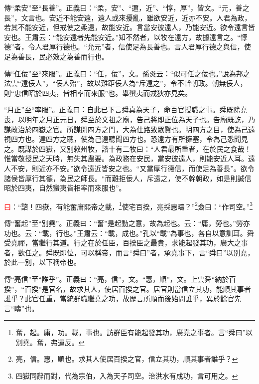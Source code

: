 {\noindent\zhuan{}\fzbyks 傳“柔安”至“長善”。正義曰：“柔，安”、“邇，近”、“惇，厚”，皆文。“元，善之長”，文言也。安近不能安遠，遠人或來擾亂，雖欲安近，近亦不安。人君為政，若其不能安近，但戒使之柔遠，故能安近。言當安彼遠人，乃能安近。欲令遠言皆安也。王肅云：“能安遠者先能安近。”知不然者，以牧在遠方，故據遠言之。“惇德”者，令人君厚行德也。“允元”者，信使足為長善也。言人君厚行德之與信，使足為善長，民必效之為善而行也。 \par}

{\noindent\zhuan{}\fzbyks 傳“任佞”至“來服”。正義曰：“任，佞”，文。孫炎云：“似可任之佞也。”說為邦之法雲“遠佞人”，“佞人殆”，故以難距佞人為“斥遠之”，令不幹朝政。朝無佞人，則“忠信昭於四夷，皆相率而來服”也。舉蠻夷而戎狄亦見矣。 \par}

{\noindent\shu{}\fzkt “月正”至“率服”。正義曰：自此已下言舜真為天子，命百官授職之事。舜既除堯喪，以明年之月正元日，舜至於文祖之廟，告己將即正位為天子也。告廟既訖，乃謀政治於四嶽之官。所謀開四方之門，大為仕路致眾賢也。明四方之目，使為己遠視四方也。達四方之聰，使為己遠聽聞四方也。恐遠方有所擁塞，令為己悉聞見之。既謀於四嶽，又別敕州牧，諮十有二牧曰：“人君最所重者，在於民之食哉！惟當敬授民之天時，無失其農要。為政務在安民，當安彼遠人，則能安近人耳。遠人不安，則近亦不安。”欲令遠近皆安之也。“又當厚行德信，而使足為善長”。欲令諸侯皆厚行其德，為民之師長。“而難拒佞人，斥遠之，使不幹朝政，如是則誠信昭於四夷，自然蠻夷皆相率而來服也”。 \par}

\textcolor{red}{曰}：“諮！四嶽，有能奮庸熙帝之載，\footnote{奮，起。庸，功。載，事也。訪群臣有能起發其功，廣堯之事者。言“舜曰”以別堯。奮，弗運反。}使宅百揆，亮採惠疇？”\footnote{亮，信。惠，順也。求其人使居百揆之官，信立其功，順其事者誰乎？}僉曰：“作司空。”\footnote{四嶽同辭而對，代為宗伯，入為天子司空。治洪水有成功，言可用之。}

{\noindent\zhuan{}\fzbyks 傳“奮起”至“別堯”。正義曰：“奮”是起動之意，故為起也。云：“庸，勞也。”勞亦功也。云：“載，行也。”王肅云：“載，成也。”孔以“載”為事也，各自以意訓耳。舜受堯禪，當繼行其道。行之在於任臣，百揆臣之最貴，求能起發其功，廣大之事者，欲任之。舜既即位，可以稱帝，而言“舜曰”者，承堯事下，言“舜曰”以別堯，於此一別，以下稱帝也。 \par}

{\noindent\zhuan{}\fzbyks 傳“亮信”至“誰乎”。正義曰：“亮，信”，文。“惠，順”，文。上雲舜“納於百揆”，“百揆”是官名，故求其人，使居百揆之官。居官則當信立其功，能順其事者誰乎？此官任重，當統群職繼堯之功，故歷言所順而後始問誰乎，異於餘官先言“疇”也。 \par}


